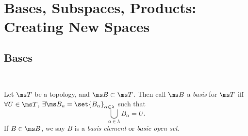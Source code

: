 \chapter{Bases, Subspaces, Products: Creating New Spaces}
\section{Bases}~
\begin{definition}
  Let $\ms T$ be a topology, and $\ms B \subset \ms T$. Then call $\ms B$ a
  \emph{basis} for $\ms T$ iff $\forall U \in \ms T$, $\exists \ms B_u =
  \set{B_\alpha}_{\alpha \in \lambda}$ such that
  \[
    \bigcup_{\alpha \in \lambda} B_\alpha = U.
  \]
  If $B \in \ms B$, we say $B$ is a \emph{basis element} or \emph{basic open
    set}.
\end{definition}

